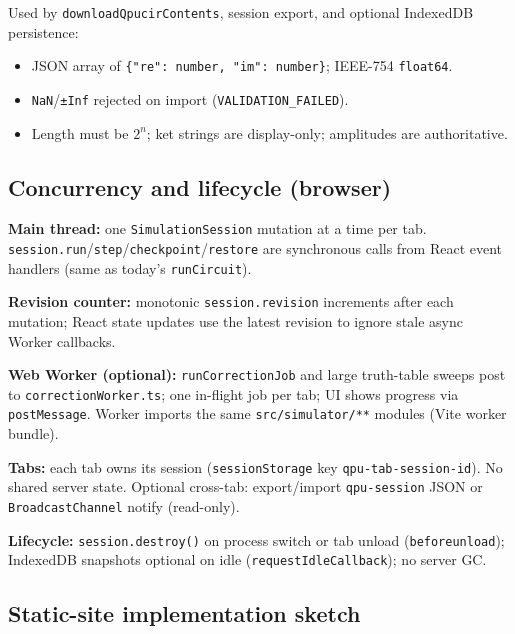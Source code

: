 \documentclass[11pt,a4paper]{article}
\begin{document}
Used by \texttt{downloadQpucirContents}, session export, and optional IndexedDB persistence:
\begin{itemize}
  \item JSON array of \texttt{\{"re": number, "im": number\}}; IEEE-754 \texttt{float64}.
  \item \texttt{NaN}/\texttt{±Inf} rejected on import (\texttt{VALIDATION\_FAILED}).
  \item Length must be $2^n$; ket strings are display-only; amplitudes are authoritative.
\end{itemize}

\subsection{Concurrency and lifecycle (browser)}

\textbf{Main thread:} one \texttt{SimulationSession} mutation at a time per tab. \texttt{session.run}/\texttt{step}/\texttt{checkpoint}/\texttt{restore} are synchronous calls from React event handlers (same as today's \texttt{runCircuit}).

\textbf{Revision counter:} monotonic \texttt{session.revision} increments after each mutation; React state updates use the latest revision to ignore stale async Worker callbacks.

\textbf{Web Worker (optional):} \texttt{runCorrectionJob} and large truth-table sweeps post to \texttt{correctionWorker.ts}; one in-flight job per tab; UI shows progress via \texttt{postMessage}. Worker imports the same \texttt{src/simulator/**} modules (Vite worker bundle).

\textbf{Tabs:} each tab owns its session (\texttt{sessionStorage} key \texttt{qpu-tab-session-id}). No shared server state. Optional cross-tab: export/import \texttt{qpu-session} JSON or \texttt{BroadcastChannel} notify (read-only).

\textbf{Lifecycle:} \texttt{session.destroy()} on process switch or tab unload (\texttt{beforeunload}); IndexedDB snapshots optional on idle (\texttt{requestIdleCallback}); no server GC.

\subsection{Static-site implementation sketch}
\end{document}
